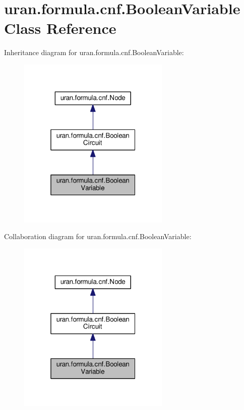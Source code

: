 \hypertarget{classuran_1_1formula_1_1cnf_1_1_boolean_variable}{}\section{uran.\+formula.\+cnf.\+Boolean\+Variable Class Reference}
\label{classuran_1_1formula_1_1cnf_1_1_boolean_variable}


Inheritance diagram for uran.\+formula.\+cnf.\+Boolean\+Variable\+:
\nopagebreak
\begin{figure}[H]
\begin{center}
\leavevmode
\includegraphics[width=205pt]{classuran_1_1formula_1_1cnf_1_1_boolean_variable__inherit__graph}
\end{center}
\end{figure}


Collaboration diagram for uran.\+formula.\+cnf.\+Boolean\+Variable\+:
\nopagebreak
\begin{figure}[H]
\begin{center}
\leavevmode
\includegraphics[width=205pt]{classuran_1_1formula_1_1cnf_1_1_boolean_variable__coll__graph}
\end{center}
\end{figure}

